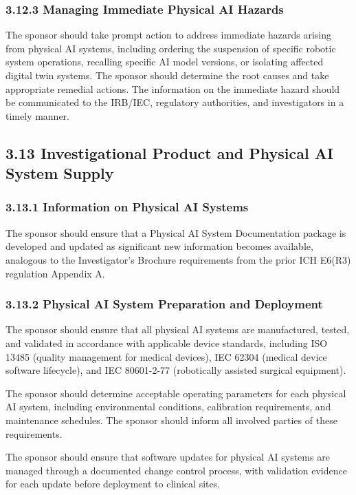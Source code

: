 \documentclass[11pt]{article}
\begin{document}
\subsubsection{3.12.3 Managing Immediate Physical AI Hazards}

The sponsor should take prompt action to address immediate hazards arising from physical AI systems, including ordering the suspension of specific robotic system operations, recalling specific AI model versions, or isolating affected digital twin systems. The sponsor should determine the root causes and take appropriate remedial actions. The information on the immediate hazard should be communicated to the IRB/IEC, regulatory authorities, and investigators in a timely manner.

\subsection{3.13 Investigational Product and Physical AI System Supply}

\subsubsection{3.13.1 Information on Physical AI Systems}

The sponsor should ensure that a Physical AI System Documentation package is developed and updated as significant new information becomes available, analogous to the Investigator's Brochure requirements from the prior ICH E6(R3) regulation Appendix A.

\subsubsection{3.13.2 Physical AI System Preparation and Deployment}

\begin{description}[leftmargin=2.5cm,style=sameline]

\item[(a)] The sponsor should ensure that all physical AI systems are manufactured, tested, and validated in accordance with applicable device standards, including ISO 13485 (quality management for medical devices), IEC 62304 (medical device software lifecycle), and IEC 80601-2-77 (robotically assisted surgical equipment).

\item[(b)] The sponsor should determine acceptable operating parameters for each physical AI system, including environmental conditions, calibration requirements, and maintenance schedules. The sponsor should inform all involved parties of these requirements.

\item[(c)] The sponsor should ensure that software updates for physical AI systems are managed through a documented change control process, with validation evidence for each update before deployment to clinical sites.

\end{description}
\end{document}
